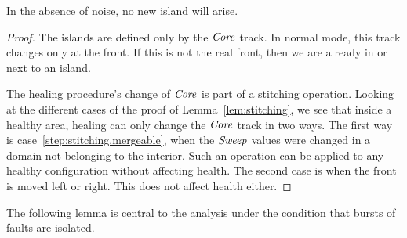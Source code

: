 \documentclass[11pt]{memoir}
\theoremstyle{definition} %
\newcommand{\fld}[1]{\ensuremath{\textit{#1\/}}}
\newcommand{\Core}{\fld{Core}}
\newcommand{\Sweep}{\fld{Sweep}} %
\begin{document}
\begin{lemma}
In the absence of noise, no new island will arise.
\end{lemma}
\begin{proof}
The islands are defined only by the \( \Core \) track.
In normal mode, this track changes only at the front.
If this is not the real front, then we are already in or next to an island.

The healing procedure's change of \( \Core \) is part of a stitching operation.
Looking at the different cases of the proof of Lemma~\ref{lem:stitching}, we see that 
inside a healthy area, healing can only change the \( \Core \) track in two ways.
The first way is case~\ref{step:stitching.mergeable}, when the \( \Sweep \) values were changed
in a domain not belonging to the interior.
Such an operation can be applied to any healthy configuration without affecting health.
The second case is when the front is moved left or right.
This does not affect health either.
\end{proof}

The following lemma is central to the analysis under the condition that bursts of faults are isolated.
\end{document}
